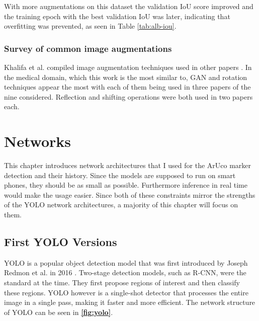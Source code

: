 \documentclass[10pt]{book}
\newcommand{\figureref}[1]{\textbf{\autoref{#1}}}
\begin{document}
With more augmentations on this dataset the validation \ac{IoU} score improved and the training epoch with the best validation \ac{IoU} was later, indicating that overfitting was prevented, as seen in Table \ref{tab:alb-iou}.

\subsection{Survey of common image augmentations}

Khalifa et al. compiled image augmentation techniques used in other papers \cite{khalifa2022comprehensive}. In the medical domain, which this work is the most similar to, \ac{GAN} and rotation techniques appear the most with each of them being used in three papers of the nine considered. Reflection and shifting operations were both used in two papers each.

\chapter{Networks}
\label{chap:netw}

This chapter introduces network architectures that I used for the \ac{ArUco} marker detection and their history. Since the models are supposed to run on smart phones, they should be as small as possible. Furthermore inference in real time would make the usage easier. Since both of these constraints mirror the strengths of the \ac{YOLO} network architectures, a majority of this chapter will focus on them.

\section{First YOLO Versions}

\ac{YOLO} is a popular object detection model that was first introduced by Joseph Redmon et al. in 2016 \cite{redmon2016you}. Two-stage detection models, such as R-CNN, were the standard at the time. They first propose regions of interest and then classify these regions. \ac{YOLO} however is a single-shot detector that processes the entire image in a single pass, making it faster and more efficient. The network structure of \ac{YOLO} can be seen in \figureref{fig:yolo}.
\end{document}
